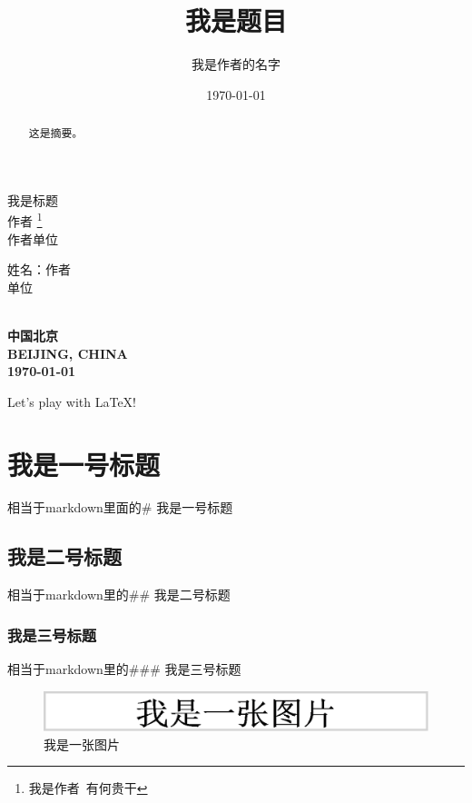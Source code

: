 \documentclass[UTF8]{ctexart}
\title{我是题目}
\author{我是作者的名字}
\date{\today}%
\begin{document}

\begin{titlepage}
	\vspace{30mm}
\begin{center}
	{\heiti\Huge 我是标题}\\[30mm]
	{\large 作者 \footnote{我是作者\ 有何贵干}}\\[5mm]
	作者单位\\[15mm]
	\begin{minipage}[c]{200pt}
		\large 姓\qquad 名：作者\\
		单位\\
	\end{minipage}\\[100mm]
	\textbf{\heiti 中国\quad 北京\\ 
	BEIJING, CHINA\\
	\today}
\end{center}
\end{titlepage}
\tableofcontents

\begin{abstract}
这是摘要。
\end{abstract}

Let's play with \LaTeX!\cite{1}
\section{我是一号标题}
相当于markdown里面的\# 我是一号标题
\subsection{我是二号标题}
相当于markdown里的\#\# 我是二号标题
\subsubsection{我是三号标题}
相当于markdown里的\#\#\# 我是三号标题

\begin{figure}[H]%
\centering%
\includegraphics[width = .8\textwidth]{pic.png}%
\caption{我是一张图片}%
\label{fig:1}%
\end{figure}
\end{document}

